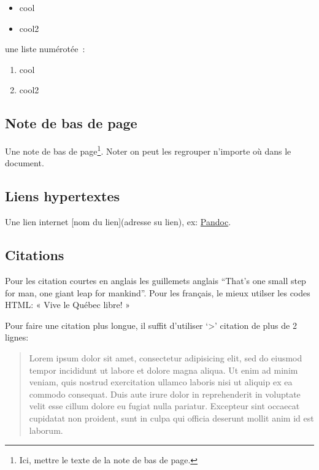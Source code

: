 \begin{itemize}
\tightlist
\item
  cool
\item
  cool2
\end{itemize}

une liste numérotée~:

\begin{enumerate}
\def\labelenumi{\arabic{enumi}.}
\tightlist
\item
  cool
\item
  cool2
\end{enumerate}

\subsection{Note de bas de page}\label{note-de-bas-de-page}

Une note de bas de page\footnote{Ici, mettre le texte de la note de bas
  de page.}. Noter on peut les regrouper n'importe où dans le document.

\subsection{Liens hypertextes}\label{liens-hypertextes}

Une lien internet {[}nom du lien{]}(adresse su lien), ex:
\href{http://pandoc.org}{Pandoc}.

\subsection*{Citations}\label{citations}

Pour les citation courtes en anglais les guillemets anglais ``That's one
small step for man, one giant leap for mankind''. Pour les français, le
mieux utilser les codes HTML: « Vive le Québec libre! »

Pour faire une citation plus longue, il suffit d'utiliser
`\textgreater{}' citation de plus de 2 lignes:

\begin{quote}
Lorem ipsum dolor sit amet, consectetur adipisicing elit, sed do eiusmod
tempor incididunt ut labore et dolore magna aliqua. Ut enim ad minim
veniam, quis nostrud exercitation ullamco laboris nisi ut aliquip ex ea
commodo consequat. Duis aute irure dolor in reprehenderit in voluptate
velit esse cillum dolore eu fugiat nulla pariatur. Excepteur sint
occaecat cupidatat non proident, sunt in culpa qui officia deserunt
mollit anim id est laborum.
\end{quote}

